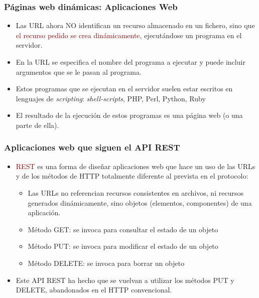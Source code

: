 \documentclass[hyperref={pdfpagelabels=true},ucs]{beamer}
\newcommand{\res}[1]{\textcolor{darkred}{#1}}
\begin{document}
\begin{frame}[fragile]
\frametitle{Páginas web dinámicas: Aplicaciones Web}

\begin{itemize}
\item Las URL ahora NO identifican un recurso almacenado en un fichero,
  sino que \res{el recurso pedido se crea dinámicamente}, ejecutándose un
  programa en el servidor.
\item En la URL se especifica el nombre del programa a ejecutar y
  puede incluir argumentos que se le pasan al programa.
\item Estos programas que se ejecutan en el servidor suelen estar
  escritos en lenguajes de \emph{scripting}: \emph{shell-scripts},
  PHP, Perl, Python, Ruby
\item El resultado de la ejecución de estos programas es una página
  web (o una parte de ella).
\end{itemize}

\end{frame}






\begin{frame}[fragile]
\frametitle{Aplicaciones web que siguen el API REST}

\begin{itemize}
\item \res{REST} es una forma de diseñar aplicaciones web que hace un uso de
  las URLs y de los métodos de HTTP totalmente diferente al prevista
  en el protocolo:
  \begin{itemize}
  \item Las URLs no referencian recursos consistentes en archivos, ni
    recursos generados dinámicamente, sino objetos (elementos,
    componentes) de una aplicación.
  \item Método GET: se invoca para consultar el estado de un objeto
  \item Método PUT: se invoca para modificar el estado de un objeto
  \item Método DELETE: se invoca para borrar un objeto
  \end{itemize}
\item Este API REST ha hecho que se vuelvan a utilizar los métodos PUT
  y DELETE, abandonados en el HTTP convencional.

\end{itemize}

\end{frame}
\end{document}
